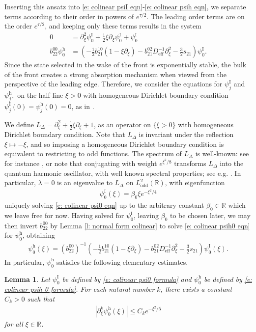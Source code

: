 \documentclass[11pt]{article}
\newcommand{\R}{\mathbb{R}}
\newtheorem{lemma}[prop]{Lemma}
\numberwithin{equation}{section}
\numberwithin{prop}{section}
\newcommand{\psih}{\psi^\mathrm{h}}
\newcommand{\Deff}{D_\mathrm{eff}}
\newcommand{\psiI}{\psi^\mathrm{I}}
\begin{document}
Inserting this ansatz into \eqref{e: colinear psiI eqn}-\eqref{e: colinear psih eqn}, we separate terms according to their order in powers of $e^{\tau/2}$. The leading order terms are on the order $e^{\tau/2}$, and keeping only these terms results in the system
\begin{align}
0 &= \partial_\xi^2 \psiI_0 + \frac{1}{2} \xi \partial_\xi \psiI_0 + \psiI_0 \label{e: colinear psi0 eqn}\\
b_{22}^{00} \psih_0 &= \left( -\frac{1}{2}b_{21}^{10} (1 - \xi \partial_\xi) - b_{21}^{02} \Deff^{-1} \partial_\xi^2 - \frac{3}{2} s_{21} \right) \psiI_0 \label{e: colinear psih0 eqn}. 
\end{align}
Since the state selected in the wake of the front is exponentially stable, the bulk of the front creates a strong absorption mechanism when viewed from the perspective of the leading edge. Therefore, we consider the equations for $\psiI_j$ and  $\psih_j,$ on the half-line $\xi > 0$ with homogeneous Dirichlet boundary condition $\psiI_j (0) = \psih_j (0) = 0$, as in \cite{CAMS, NRRrefined}. 

We define $L_\Delta = \partial_\xi^2 + \frac{1}{2} \xi \partial_\xi + 1$, as an operator on $\{ \xi > 0 \}$ with homogeneous Dirichlet boundary condition. Note that $L_\Delta$ is invariant under the reflection $\xi \mapsto -\xi$, and so imposing a homogeneous Dirichlet boundary condition is equivalent to restricting to odd functions. The spectrum of $L_\Delta$ is well-known: see for instance \cite[Appendix A]{GallayWayne}, or note that conjugating with weight $e^{\xi^2/8}$ transforms $L_\Delta$ into the quantum harmonic oscillator, with well known spectral properties; see e.g. \cite{Helffer}. In particular, $\lambda = 0$ is an eigenvalue to $L_\Delta$ on $L^2_\mathrm{odd}(\R)$, with eigenfunction 
\begin{align}
\psiI_0 (\xi) = \beta_0 \xi e^{-\xi^2/4} \label{e: colinear psi0 formula}
\end{align}
uniquely solving \eqref{e: colinear psi0 eqn} up to the arbitrary constant $\beta_0 \in \R$ which we leave free for now. Having solved for $\psiI_0$, leaving $\beta_0$ to be chosen later, we may then invert $b_{22}^{00}$ by Lemma \ref{l: normal form colinear} to solve \eqref{e: colinear psih0 eqn} for $\psih_0$, obtaining
\begin{align}
\psih_0 (\xi) = (b_{22}^{00})^{-1} \left( -\frac{1}{2}b_{21}^{10} (1 -  \xi \partial_\xi) - b_{21}^{02} \Deff^{-1} \partial_\xi^2 - \frac{3}{2} s_{21} \right) \psiI_0 (\xi). \label{e: colinear psih 0 formula}
\end{align}
In particular, $\psih_0$ satisfies the following elementary estimates.
\begin{lemma}\label{l: colinear psih 0 estimates}
	Let $\psiI_0$ be defined by \eqref{e: colinear psi0 formula} and $\psih_0$ be defined by \eqref{e: colinear psih 0 formula}. For each natural number $k$, there exists a constant $C_k > 0$ such that 
	\begin{align}
	|\partial_\xi^k \psih_0(\xi) | \leq C_k e^{-\xi^2/5}
	\end{align}
	for all $\xi \in \R$. 
\end{lemma}
\end{document}
